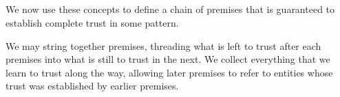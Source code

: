 {\begin{code}
\AgdaSymbol{)}\AgdaSpace{}%
\<%
\\
\>[0]\AgdaSpace{}%
%
\>[8]\AgdaSpace{}%
\AgdaSpace{}%
\AgdaSymbol{=}\AgdaSpace{}%
\AgdaSpace{}%
\<%
\\
\>[0]\AgdaSymbol{(}\AgdaSpace{}%
\AgdaSpace{}%
\AgdaSymbol{)}\AgdaSpace{}%
\AgdaSpace{}%
\AgdaSpace{}%
\AgdaSymbol{=}\AgdaSpace{}%
\AgdaSymbol{(}\AgdaSpace{}%
\AgdaSpace{}%
\AgdaSymbol{)}\AgdaSpace{}%
\AgdaSpace{}%
\AgdaSymbol{(}\AgdaSpace{}%
\AgdaSpace{}%
\AgdaSymbol{)}\<%
\\
\>[0]\AgdaSpace{}%
%
\>[8]\AgdaSpace{}%
\AgdaSpace{}%
\AgdaSymbol{=}\AgdaSpace{}%
\AgdaSpace{}%
\AgdaSymbol{(}\AgdaSpace{}%
\AgdaSpace{}%
\AgdaSymbol{)}\<%
\\
\>[0]%
\>[8]\AgdaSpace{}%
\AgdaSpace{}%
\AgdaSymbol{=}\AgdaSpace{}%
\<%
\end{code}
}
We now use these concepts to define a chain of premises that is guaranteed to
establish complete trust in some pattern.

We may string together premises, threading what is left to trust
after each premises into what is still to trust in the next. We collect everything
that we learn to trust along the way, allowing later premises to refer to entities
whose trust was established by earlier premises.

